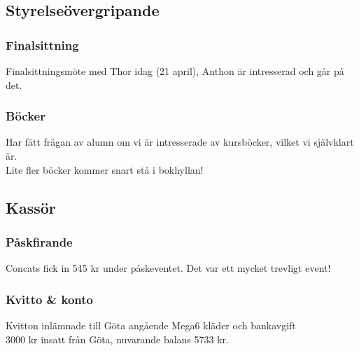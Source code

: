 \documentclass[protokoll]{dvd}
\begin{document}
\subsection{Styrelseövergripande}

\subsubsection{Finalsittning}
Finalsittningsmöte med Thor idag (21 april), Anthon är intresserad och går på det.

\subsubsection{Böcker}

Har fått frågan av alumn om vi är intresserade av kursböcker, vilket vi självklart är. \\
Lite fler böcker kommer snart stå i bokhyllan!


\subsection{Kassör}

\subsubsection{Påskfirande}
Concats fick in 545 kr under påskeventet. Det var ett mycket trevligt event!

\subsubsection{Kvitto \& konto}
Kvitton inlämnade till Göta angående Mega6 kläder och bankavgift \\
3000 kr insatt från Göta, nuvarande balans 5733 kr.



\newpage
\end{document}
